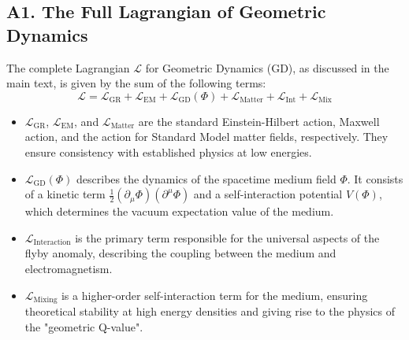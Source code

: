 \documentclass[aps,prl,twocolumn,superscriptaddress,longbibliography,floatfix]{revtex4-2}
\begin{document}
\subsection{A1. The Full Lagrangian of Geometric Dynamics}
The complete Lagrangian $\mathcal{L}$ for Geometric Dynamics (GD), as discussed in the main text, is given by the sum of the following terms:
\begin{equation}
    \mathcal{L} = \mathcal{L}_{\text{GR}} + \mathcal{L}_{\text{EM}} + \mathcal{L}_{\text{GD}}(\Phi) + \mathcal{L}_{\text{Matter}} + \mathcal{L}_{\text{Int}} + \mathcal{L}_{\text{Mix}}
\end{equation}
\begin{itemize}
    \item $\mathcal{L}_{\text{GR}}$, $\mathcal{L}_{\text{EM}}$, and $\mathcal{L}_{\text{Matter}}$ are the standard Einstein-Hilbert action, Maxwell action, and the action for Standard Model matter fields, respectively. They ensure consistency with established physics at low energies.
    \item $\mathcal{L}_{\text{GD}}(\Phi)$ describes the dynamics of the spacetime medium field $\Phi$. It consists of a kinetic term $\frac{1}{2}(\partial_\mu\Phi)(\partial^\mu\Phi)$ and a self-interaction potential $V(\Phi)$, which determines the vacuum expectation value of the medium.
    \item $\mathcal{L}_{\text{Interaction}}$ is the primary term responsible for the universal aspects of the flyby anomaly, describing the coupling between the medium and electromagnetism.
    \item $\mathcal{L}_{\text{Mixing}}$ is a higher-order self-interaction term for the medium, ensuring theoretical stability at high energy densities and giving rise to the physics of the "geometric Q-value".
\end{itemize}
\end{document}
